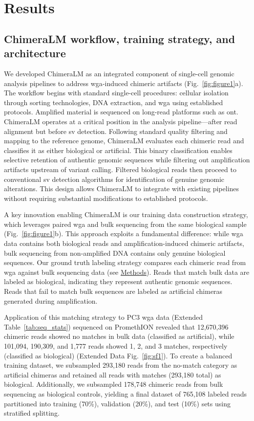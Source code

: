 \documentclass[pdflatex,sn-nature,lineno]{sn-jnl}%
\theoremstyle{thmstyleone}%
\theoremstyle{thmstyletwo}%
\theoremstyle{thmstylethree}%
\begin{document}
\section*{Results}\label{sec:results}

\subsection*{ChimeraLM workflow, training strategy, and architecture}

We developed ChimeraLM as an integrated component of single-cell genomic analysis pipelines to address \gls{wga}-induced chimeric artifacts (Fig.~\ref{fig:figure1}a).
The workflow begins with standard single-cell procedures: cellular isolation through sorting technologies, DNA extraction, and \gls{wga} using established protocols.
Amplified material is sequenced on long-read platforms such as \gls{ont}.
ChimeraLM operates at a critical position in the analysis pipeline—after read alignment but before \gls{sv} detection.
Following standard quality filtering and mapping to the reference genome, ChimeraLM evaluates each chimeric read and classifies it as either biological or artificial.
This binary classification enables selective retention of authentic genomic sequences while filtering out amplification artifacts upstream of variant calling.
Filtered biological reads then proceed to conventional \gls{sv} detection algorithms for identification of genuine genomic alterations.
This design allows ChimeraLM to integrate with existing pipelines without requiring substantial modifications to established protocols.

A key innovation enabling ChimeraLM is our training data construction strategy, which leverages paired \gls{wga} and bulk sequencing from the same biological sample (Fig.~\ref{fig:figure1}b).
This approach exploits a fundamental difference: while \gls{wga} data contains both biological reads and amplification-induced chimeric artifacts, bulk sequencing from non-amplified DNA contains only genuine biological sequences.
Our ground truth labeling strategy compares each chimeric read from \gls{wga} against bulk sequencing data (see \hyperref[sec:methods]{Methods}).
Reads that match bulk data are labeled as biological, indicating they represent authentic genomic sequences.
Reads that fail to match bulk sequences are labeled as artificial chimeras generated during amplification.

Application of this matching strategy to PC3 \gls{wga} data (Extended Table~\ref{tab:seq_stats}) sequenced on PromethION revealed that 12,670,396 chimeric reads showed no matches in bulk data (classified as artificial), while 101,094, 190,309, and 1,777 reads showed 1, 2, and 3 matches, respectively (classified as biological) (Extended Data Fig.~\ref{fig:sf1}).
To create a balanced training dataset, we subsampled 293,180 reads from the no-match category as artificial chimeras and retained all reads with matches (293,180 total) as biological.
Additionally, we subsampled 178,748 chimeric reads from bulk sequencing as biological controls, yielding a final dataset of 765,108 labeled reads partitioned into training (70\%), validation (20\%), and test (10\%) sets using stratified splitting.
\end{document}
